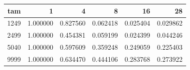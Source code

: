 \begin{tabular}{rrrrrr}
\toprule
tam & 1 & 4 & 8 & 16 & 28 \\
\midrule
1249 & 1.000000 & 0.827560 & 0.062418 & 0.025404 & 0.029862 \\
2499 & 1.000000 & 0.454381 & 0.059199 & 0.024399 & 0.044246 \\
5040 & 1.000000 & 0.597609 & 0.359248 & 0.249059 & 0.225403 \\
9999 & 1.000000 & 0.634470 & 0.444106 & 0.283768 & 0.273922 \\
\bottomrule
\end{tabular}
